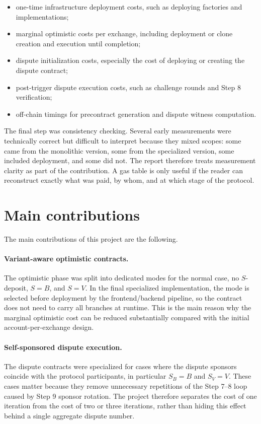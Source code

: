 \begin{itemize}
  \item one-time infrastructure deployment costs, such as deploying factories and
  implementations;
  \item marginal optimistic costs per exchange, including deployment or clone creation and
  execution until completion;
  \item dispute initialization costs, especially the cost of deploying or creating the
  dispute contract;
  \item post-trigger dispute execution costs, such as challenge rounds and Step 8
  verification;
  \item off-chain timings for precontract generation and dispute witness computation.
\end{itemize}

The final step was consistency checking. Several early measurements were technically correct
but difficult to interpret because they mixed scopes: some came from the monolithic version,
some from the specialized version, some included deployment, and some did not. The report
therefore treats measurement clarity as part of the contribution. A gas table is only useful
if the reader can reconstruct exactly what was paid, by whom, and at which stage of the
protocol.

\section{Main contributions}

The main contributions of this project are the following.

\paragraph{Variant-aware optimistic contracts.}
The optimistic phase was split into dedicated modes for the normal case, no \(S\)-deposit,
\(S=B\), and \(S=V\). In the final specialized implementation, the mode is selected before
deployment by the frontend/backend pipeline, so the contract does not need to carry all
branches at runtime. This is the main reason why the marginal optimistic cost can be reduced
substantially compared with the initial account-per-exchange design.

\paragraph{Self-sponsored dispute execution.}
The dispute contracts were specialized for cases where the dispute sponsors coincide with
the protocol participants, in particular \(S_B=B\) and \(S_V=V\). These cases matter because
they remove unnecessary repetitions of the Step 7--8 loop caused by Step 9 sponsor rotation.
The project therefore separates the cost of one iteration from the cost of two or three
iterations, rather than hiding this effect behind a single aggregate dispute number.

